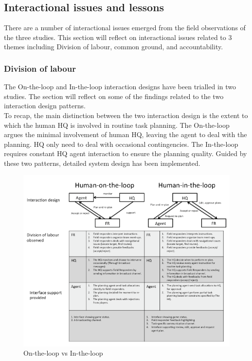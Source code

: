 \subsection{Interactional issues and lessons}\label{sec:conclusionIssue}
There are a number of interactional issues emerged from the field observations of the three studies. This section will reflect on interactional issues related to 3 themes including Division of labour, common ground, and accountability.

\subsubsection{Division of labour}\label{sec:conclusionHH}
The On-the-loop and In-the-loop interaction designs have been trialled in two studies. The section will reflect on some of the findings related to the two interaction design patterns. \\

To recap, the main distinction between the two interaction design is the extent to which the human HQ is involved in routine task planning. The On-the-loop  argues the minimal involvement of human HQ, leaving the agent to deal with the planning. HQ only need to deal with occasional contingencies. The In-the-loop requires constant HQ agent interaction to ensure the planning quality. Guided by these two patterns, detailed system design has been implemented.\\

\begin{figure}[h]
  \centering
  \includegraphics[width=1\textwidth]{img/conclusion/huilvshuol}
  \caption{On-the-loop vs In-the-loop}
  \label{fig:huilvshuol}
\end{figure}


